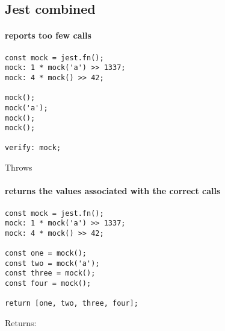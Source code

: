 \subsection*{Jest combined}

\paragraph*{reports too few calls}
\begin{verbatim}
const mock = jest.fn();
mock: 1 * mock('a') >> 1337;
mock: 4 * mock() >> 42;

mock();
mock('a');
mock();
mock();

verify: mock;
\end{verbatim}
Throws
\paragraph*{returns the values associated with the correct calls}
\begin{verbatim}
const mock = jest.fn();
mock: 1 * mock('a') >> 1337;
mock: 4 * mock() >> 42;

const one = mock();
const two = mock('a');
const three = mock();
const four = mock();

return [one, two, three, four];
\end{verbatim}
Returns: \code{[42, 1337, 42, 42]}
